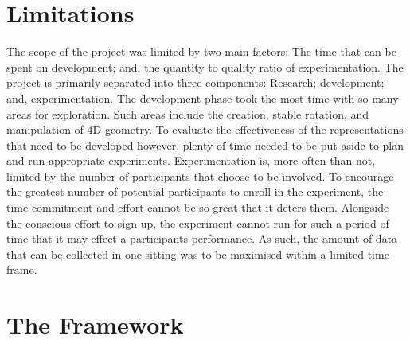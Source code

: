 \documentclass{l4proj}
\begin{document}
\section{Limitations}

The scope of the project was limited by two main factors: The time that can be spent on development; and, the quantity to quality ratio of experimentation. 
The project is primarily separated into three components: Research; development; and, experimentation. The development phase took the most time with so many areas for exploration. Such areas include the creation, stable rotation, and manipulation of 4D geometry. To evaluate the effectiveness of the representations that need to be developed however, plenty of time needed to be put aside to plan and run appropriate experiments.
Experimentation is, more often than not, limited by the number of participants that choose to be involved. To encourage the greatest number of potential participants to enroll in the experiment, the time commitment and effort cannot be so great that it deters them. Alongside the conscious effort to sign up, the experiment cannot run for such a period of time that it may effect a participants performance. As such, the amount of data that can be collected in one sitting was to be maximised within a limited time frame.

\section{The Framework}
\label{requirements_framework}
\end{document}
